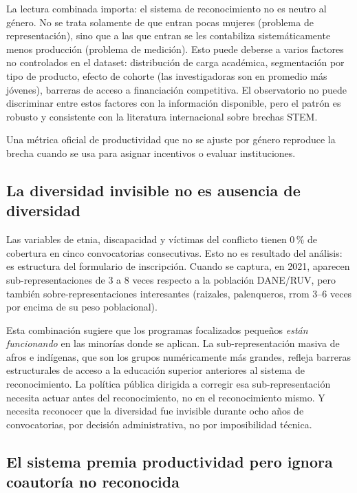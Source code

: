 \documentclass[11pt,a4paper,oneside]{article}
\begin{document}
La lectura combinada importa: el sistema de reconocimiento no es neutro al género. No se trata solamente de que entran pocas mujeres (problema de representación), sino que a las que entran se les contabiliza sistemáticamente menos producción (problema de medición). Esto puede deberse a varios factores no controlados en el dataset: distribución de carga académica, segmentación por tipo de producto, efecto de cohorte (las investigadoras son en promedio más jóvenes), barreras de acceso a financiación competitiva. El observatorio no puede discriminar entre estos factores con la información disponible, pero el patrón es robusto y consistente con la literatura internacional sobre brechas STEM.

Una métrica oficial de productividad que no se ajuste por género reproduce la brecha cuando se usa para asignar incentivos o evaluar instituciones.

\subsection{La diversidad invisible no es ausencia de diversidad}

Las variables de etnia, discapacidad y víctimas del conflicto tienen 0\,\% de cobertura en cinco convocatorias consecutivas. Esto no es resultado del análisis: es estructura del formulario de inscripción. Cuando se captura, en 2021, aparecen sub-representaciones de 3 a 8 veces respecto a la población DANE/RUV, pero también sobre-representaciones interesantes (raizales, palenqueros, rrom 3--6 veces por encima de su peso poblacional).

Esta combinación sugiere que los programas focalizados pequeños \emph{están funcionando} en las minorías donde se aplican. La sub-representación masiva de afros e indígenas, que son los grupos numéricamente más grandes, refleja barreras estructurales de acceso a la educación superior anteriores al sistema de reconocimiento. La política pública dirigida a corregir esa sub-representación necesita actuar antes del reconocimiento, no en el reconocimiento mismo. Y necesita reconocer que la diversidad fue invisible durante ocho años de convocatorias, por decisión administrativa, no por imposibilidad técnica.

\subsection{El sistema premia productividad pero ignora coautoría no reconocida}
\end{document}
